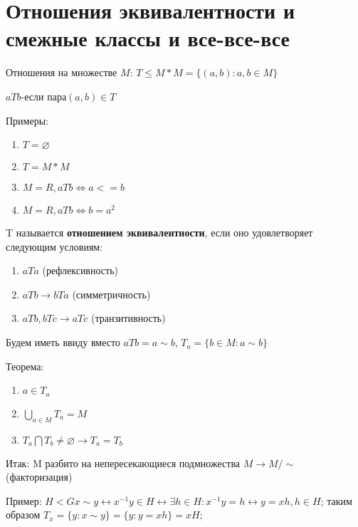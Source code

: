 \documentclass[12pt]{article}
\begin{document}
		
		
		
		\newpage
		\section{Отношения эквивалентности и смежные классы и все-все-все}
		
		Отношения на множестве $M$:
		$T \le M*M=\{(a,b):a,b\in M\}$
		
		$aTb$-если пара$(a,b)\in T$ 
		
		Примеры:
		\begin{enumerate}
			\item $T=\varnothing$
			\item $T=M*M$
			\item $M=R, aTb \Leftrightarrow a<=b$
			\item $M=R, aTb \Leftrightarrow b=a^2$
		\end{enumerate}
		
		T называется \hypertarget{indef:equiv}{\textbf{отношением эквивалентности}}, если оно удовлетворяет следующим условиям:
		\begin{enumerate}
			\item $aTa$ (рефлексивность)
			\item $aTb \rightarrow bTa$ (симметричность)
			\item $aTb, bTc \rightarrow aTc$ (транзитивность)
		\end{enumerate}
		
		Будем иметь ввиду вместо $aTb=a\sim b$, $T_a=\{b\in M:a\sim b\}$
		
		Теорема:
		\begin{enumerate}
			\item $a\in T_a$
			\item $\bigcup_{a\in M} T_a=M$
			\item $T_a \bigcap T_b \not= \varnothing \rightarrow T_a=T_b$
		\end{enumerate}
		
		
		Итак: M разбито на непересекающиеся подмножества $M\rightarrow M/\sim$ (факторизация)
		
		Пример: $H<G x\sim y \leftrightarrow x^{-1}y \in H \leftrightarrow \exists h\in H: x^{-1}y=h\leftrightarrow y=xh, h\in H$; таким образом $T_x=\{y:x\sim y\}=\{y:y=xh\}=xH;$
		
\end{document}
